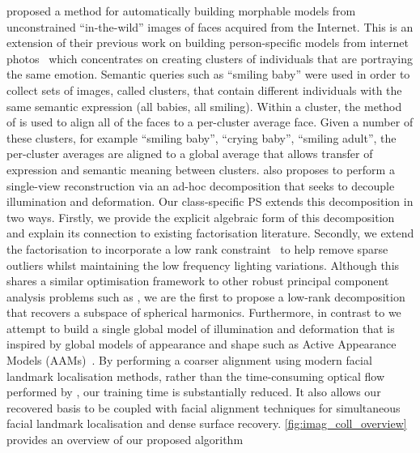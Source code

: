 \citet{KemelmacherShlizerman:2013iv} proposed a method for automatically
building morphable models from unconstrained ``in-the-wild'' images of faces
acquired from the Internet. This is an extension of their previous work
on building person-specific models from internet photos~\cite{kemelmacher2011face}
which concentrates on creating clusters of individuals that are portraying
the same emotion. Semantic queries such as ``smiling baby'' were used in order
to collect sets of images, called clusters, that contain different individuals
with the same semantic expression (all babies, all smiling). 
Within a cluster, the method of
\citet{kemelmacher2012collection} is used to align all of the faces to a
per-cluster average face. Given a number of these clusters, for example 
``smiling baby'', ``crying baby'', ``smiling adult'', the per-cluster averages
are aligned to a global average that allows transfer of expression and
semantic meaning between clusters. \citet{KemelmacherShlizerman:2013iv} also
proposes to perform a single-view reconstruction via an ad-hoc decomposition
that seeks to decouple illumination and deformation. Our class-specific
PS extends this decomposition in two ways. Firstly, we
provide the explicit algebraic form of this decomposition and explain its
connection to existing factorisation literature. Secondly, we extend the
factorisation to incorporate a low rank
constraint~\cite{candes2011robust,peng2012rasl,sagonas2014raps,cheng2013rank,%
wu2010robust,lu2013uncalibrated} to help remove sparse outliers
whilst maintaining the low frequency lighting variations. Although this shares a
similar optimisation framework to other
robust principal component analysis problems such as
\cite{candes2011robust,peng2012rasl,wu2010robust,lu2013uncalibrated},
we are the first to propose a low-rank decomposition that recovers a subspace
of spherical harmonics. Furthermore, in contrast to \citet{KemelmacherShlizerman:2013iv}
we attempt to build a single global model of illumination and deformation
that is inspired by global models of appearance and shape such as
Active Appearance Models (AAMs)~\cite{cootes2001active}. By performing a coarser
alignment using modern facial landmark localisation methods, rather than
the time-consuming optical flow performed by \citet{KemelmacherShlizerman:2013iv},
our training time is substantially reduced.
It also allows our recovered basis to be coupled with facial alignment
techniques for simultaneous facial landmark localisation and dense surface
recovery.
\cref{fig:imag_coll_overview} provides an overview of our proposed algorithm
